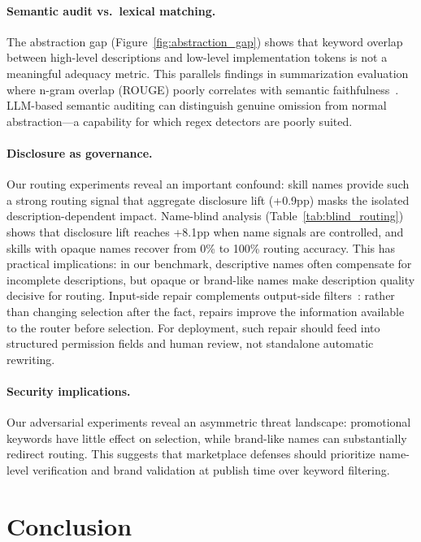 \documentclass[11pt]{article}
\begin{document}
\paragraph{Semantic audit vs.\ lexical matching.}
The abstraction gap (Figure~\ref{fig:abstraction_gap})
shows that keyword overlap between high-level descriptions
and low-level implementation tokens is not a meaningful
adequacy metric.
This parallels findings in summarization evaluation
where n-gram overlap (ROUGE) poorly correlates with
semantic faithfulness~\cite{fabbri2021summeval}.
LLM-based semantic auditing can distinguish
genuine omission from normal abstraction---a
capability for which regex detectors are poorly suited.

\paragraph{Disclosure as governance.}
Our routing experiments reveal an important confound:
skill names provide such a strong routing signal that
aggregate disclosure lift (+0.9pp) masks the isolated
description-dependent impact.
Name-blind analysis (Table~\ref{tab:blind_routing}) shows
that disclosure lift reaches +8.1pp when name signals are
controlled, and skills with opaque names recover from
0\% to 100\% routing accuracy.
This has practical implications: in our benchmark,
descriptive names often compensate for incomplete
descriptions, but opaque or brand-like names make
description quality decisive for routing.
Input-side repair complements output-side
filters~\cite{biasbusters2026}: rather than changing
selection after the fact, repairs improve the information
available to the router before selection.
For deployment, such repair should feed into structured
permission fields and human review, not standalone
automatic rewriting.

\paragraph{Security implications.}
Our adversarial experiments reveal an asymmetric
threat landscape: promotional keywords have little
effect on selection, while brand-like names can
substantially redirect routing.
This suggests that marketplace defenses should
prioritize name-level verification and brand
validation at publish time over keyword filtering.

\section{Conclusion}
\label{sec:conclusion}
\end{document}
